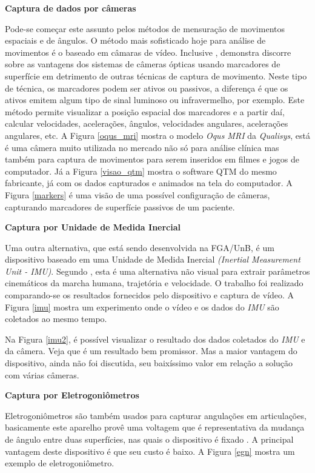 \textbf{Captura de dados por câmeras}

Pode-se começar este assunto pelos métodos de mensuração de movimentos espaciais e de ângulos.
O método mais sofisticado hoje para análise de movimentos é o baseado em câmaras de vídeo. 
Inclusive , demonstra discorre sobre as vantagens dos sistemas de câmeras ópticas usando marcadores de superfície em detrimento de outras técnicas de captura de movimento. 
Neste tipo de técnica, os marcadores podem ser ativos ou passivos, a diferença é que os ativos emitem algum tipo de sinal luminoso ou infravermelho, por exemplo. 
Este método permite visualizar a posição espacial dos marcadores e a partir daí, calcular velocidades, acelerações, ângulos, velocidades angulares, acelerações angulares, etc.
A Figura \ref{oqus_mri} mostra o modelo \emph{Oqus MRI} da \emph{Qualisys}, está é uma câmera muito utilizada no mercado não só para análise clínica mas também para captura de movimentos para serem inseridos em filmes e jogos de computador. 
Já a Figura \ref{visao_qtm} mostra o software QTM do mesmo fabricante, já com os dados capturados e animados na tela do computador.
A Figura \ref{markers} é uma visão de uma possível configuração de câmeras, capturando marcadores de superfície passivos de um paciente.

\textbf{Captura por Unidade de Medida Inercial}

Uma outra alternativa, que está sendo desenvolvida na FGA/UnB, é um dispositivo baseado em uma Unidade de Medida Inercial \emph{(Inertial Measurement Unit - IMU)}. 
Segundo , esta é uma alternativa não visual para extrair parâmetros cinemáticos da marcha humana, trajetória e velocidade. 
O trabalho foi realizado comparando-se os resultados fornecidos pelo dispositivo e captura de vídeo.
A Figura \ref{imu} mostra um experimento onde o vídeo e os dados do \emph{IMU} são coletados ao mesmo tempo.


Na Figura \ref{imu2}, é possível visualizar o resultado dos dados coletados do \emph{IMU} e da câmera. 
Veja que é um resultado bem promissor. 
Mas a maior vantagem do dispositivo, ainda não foi discutida, seu baixíssimo valor em relação a solução com várias câmeras.

\textbf{Captura por Eletrogoniômetros}

Eletrogoniômetros são também usados para capturar angulações em articulações, basicamente este aparelho provê uma voltagem que é representativa da mudança de ângulo entre duas superfícies, nas quais o dispositivo é fixado \cite{K.Ibrahim2012}. 
A principal vantagem deste dispositivo é que seu custo é baixo. A Figura \ref{egn} mostra um exemplo de eletrogoniômetro.

